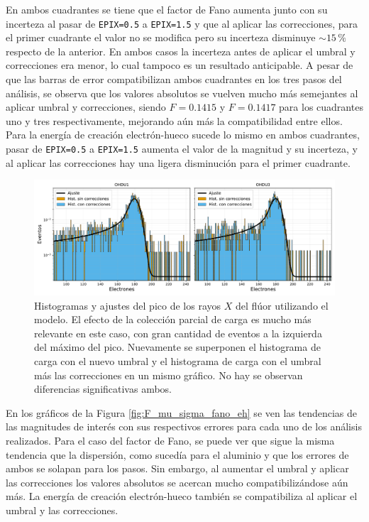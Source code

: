 En ambos cuadrantes se tiene que el factor de Fano aumenta junto con su incerteza al pasar de \verb|EPIX=0.5| a \verb|EPIX=1.5| y que al aplicar las correcciones, para el primer cuadrante el valor no se modifica pero su incerteza disminuye $\sim 15\,\%$ respecto de la anterior. En ambos casos la incerteza antes de aplicar el umbral y correcciones era menor, lo cual tampoco es un resultado anticipable. A pesar de que las barras de error compatibilizan ambos cuadrantes en los tres pasos del análisis, se observa que los valores absolutos se vuelven mucho más semejantes al aplicar umbral y correcciones, siendo $F=0.1415$ y $F=0.1417$ para los cuadrantes uno y tres respectivamente, mejorando aún más la compatibilidad entre ellos. Para la energía de creación electrón-hueco sucede lo mismo en ambos cuadrantes, pasar de \verb|EPIX=0.5| a \verb|EPIX=1.5| aumenta el valor de la magnitud y su incerteza, y al aplicar las correcciones hay una ligera disminución para el primer cuadrante. 
\begin{figure}[h]
    \centering
    \includegraphics[scale=0.5]{Figs/F_hists_ohdu1y3_dobles.pdf}
    \caption{Histogramas y ajustes del pico de los rayos $X$ del flúor utilizando el modelo. El efecto de la colección parcial de carga es mucho más relevante en este caso, con gran cantidad de eventos a la izquierda del máximo del pico. Nuevamente se superponen el histograma de carga con el nuevo umbral y el histograma de carga con el umbral más las correcciones en un mismo gráfico. No hay se observan diferencias significativas ambos.}
    \label{fig:F_OHDU1y3_EPIX15conCorr}
\end{figure}
En los gráficos de la Figura \ref{fig:F_mu_sigma_fano_eh} se ven las tendencias de las magnitudes de interés con sus respectivos errores para cada uno de los análisis realizados. Para el caso del factor de Fano, se puede ver que sigue la misma tendencia que la dispersión, como sucedía para el aluminio y que los errores de ambos se solapan para los pasos. Sin embargo, al aumentar el umbral y aplicar las correcciones los valores absolutos se acercan mucho compatibilizándose aún más. La energía de creación electrón-hueco también se compatibiliza al aplicar el umbral y las correcciones.
